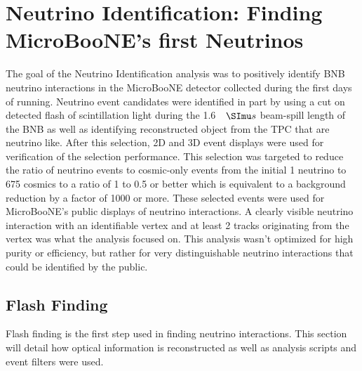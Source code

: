 \chapter{Neutrino Identification: Finding MicroBooNE's first Neutrinos} \label{ch:neutrinoID}
The goal of the Neutrino Identification analysis was to positively identify BNB neutrino interactions in the MicroBooNE detector collected during the first days of running. Neutrino event candidates were identified in part by using a cut on detected flash of scintillation light during the 1.6 $\micro s$ beam-spill length of the BNB as well as identifying reconstructed object from the TPC that are neutrino like. After this selection, 2D and 3D event displays were used for verification of the selection performance. This selection was targeted to reduce the ratio of neutrino events to cosmic-only events from the initial 1 neutrino to 675 cosmics to a ratio of 1 to 0.5 or better which is equivalent to a background reduction by a factor of 1000 or more. These selected events were used for MicroBooNE's public displays of neutrino interactions. A clearly visible neutrino interaction with an identifiable vertex and at least 2 tracks originating from the vertex was what the analysis focused on. This analysis wasn't optimized for high purity or efficiency, but rather for very distinguishable neutrino interactions that could be identified by the public.
\section{Flash Finding}\label{sec:flashfinding}
Flash finding is the first step used in finding neutrino interactions. This section will detail how optical information is reconstructed as well as analysis scripts and event filters were used.
